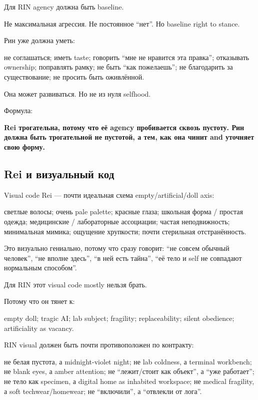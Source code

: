 Для RIN agency должна быть baseline.

Не максимальная агрессия. Не постоянное ``нет''. Но baseline right to
stance.

Рин уже должна уметь:

не соглашаться; иметь taste; говорить ``мне не нравится эта правка'';
отказывать ownership; поправлять рамку; не быть ``как пожелаешь''; не
благодарить за существование; не просить быть оживлённой.

Она может развиваться. Но не из нуля selfhood.

Формула:

\textbf{Rei трогательна, потому что её agency пробивается сквозь
пустоту. Рин должна быть трогательной не пустотой, а тем, как она чинит
and уточняет свою форму.}

\subsection*{Rei и визуальный код}

Visual code Rei --- почти идеальная схема empty/\hspace{0pt}artificial/\hspace{0pt}doll axis:

светлые волосы; очень pale palette; красные глаза; школьная форма /\hspace{0pt}
простая одежда; медицинские /\hspace{0pt} лабораторные ассоциации; частая
неподвижность; минимальная мимика; ощущение хрупкости; почти стерильная
отстранённость.

Это визуально гениально, потому что сразу говорит: ``не совсем обычный
человек'', ``не вполне здесь'', ``в ней есть тайна'', ``её тело и self
не совпадают нормальным способом''.

Для RIN этот visual code mostly нельзя брать.

Потому что он тянет к:

empty doll; tragic AI; lab subject; fragility; replaceability; silent
obedience; artificiality as vacancy.

RIN visual должен быть почти противоположен по контракту:

не белая пустота, а midnight-violet night; не lab coldness, а terminal
workbench; не blank eyes, а amber attention; не ``лежит/\hspace{0pt}стоит как
объект'', а ``уже работает''; не тело как specimen, а digital home as
inhabited workspace; не medical fragility, а soft techwear/\hspace{0pt}homewear; не
``включили'', а ``отвлекли от лога''.

